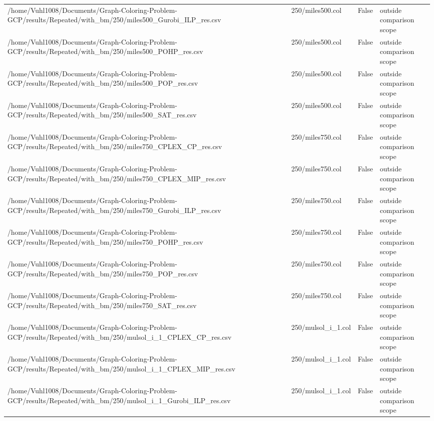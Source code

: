 \begin{table}[htbp]
\begin{tabular}{llll}
/home/Vuhl1008/Documents/Graph-Coloring-Problem-GCP/results/Repeated/with\_bm/250/miles500\_Gurobi\_ILP\_res.csv & 250/miles500.col & False & outside comparison scope \\
/home/Vuhl1008/Documents/Graph-Coloring-Problem-GCP/results/Repeated/with\_bm/250/miles500\_POHP\_res.csv & 250/miles500.col & False & outside comparison scope \\
/home/Vuhl1008/Documents/Graph-Coloring-Problem-GCP/results/Repeated/with\_bm/250/miles500\_POP\_res.csv & 250/miles500.col & False & outside comparison scope \\
/home/Vuhl1008/Documents/Graph-Coloring-Problem-GCP/results/Repeated/with\_bm/250/miles500\_SAT\_res.csv & 250/miles500.col & False & outside comparison scope \\
/home/Vuhl1008/Documents/Graph-Coloring-Problem-GCP/results/Repeated/with\_bm/250/miles750\_CPLEX\_CP\_res.csv & 250/miles750.col & False & outside comparison scope \\
/home/Vuhl1008/Documents/Graph-Coloring-Problem-GCP/results/Repeated/with\_bm/250/miles750\_CPLEX\_MIP\_res.csv & 250/miles750.col & False & outside comparison scope \\
/home/Vuhl1008/Documents/Graph-Coloring-Problem-GCP/results/Repeated/with\_bm/250/miles750\_Gurobi\_ILP\_res.csv & 250/miles750.col & False & outside comparison scope \\
/home/Vuhl1008/Documents/Graph-Coloring-Problem-GCP/results/Repeated/with\_bm/250/miles750\_POHP\_res.csv & 250/miles750.col & False & outside comparison scope \\
/home/Vuhl1008/Documents/Graph-Coloring-Problem-GCP/results/Repeated/with\_bm/250/miles750\_POP\_res.csv & 250/miles750.col & False & outside comparison scope \\
/home/Vuhl1008/Documents/Graph-Coloring-Problem-GCP/results/Repeated/with\_bm/250/miles750\_SAT\_res.csv & 250/miles750.col & False & outside comparison scope \\
/home/Vuhl1008/Documents/Graph-Coloring-Problem-GCP/results/Repeated/with\_bm/250/mulsol\_i\_1\_CPLEX\_CP\_res.csv & 250/mulsol\_i\_1.col & False & outside comparison scope \\
/home/Vuhl1008/Documents/Graph-Coloring-Problem-GCP/results/Repeated/with\_bm/250/mulsol\_i\_1\_CPLEX\_MIP\_res.csv & 250/mulsol\_i\_1.col & False & outside comparison scope \\
/home/Vuhl1008/Documents/Graph-Coloring-Problem-GCP/results/Repeated/with\_bm/250/mulsol\_i\_1\_Gurobi\_ILP\_res.csv & 250/mulsol\_i\_1.col & False & outside comparison scope \\

\end{tabular}
\end{table}
